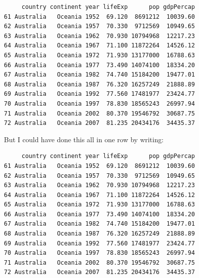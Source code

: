 \documentclass[
  letterpaper,
  DIV=11,
  numbers=noendperiod]{scrreprt}
\newenvironment{Shaded}{\begin{snugshade}}{\end{snugshade}}
\newcommand{\NormalTok}[1]{\textcolor[rgb]{0.00,0.23,0.31}{#1}}
\newcommand{\OtherTok}[1]{\textcolor[rgb]{0.00,0.23,0.31}{#1}}
\newcommand{\SpecialCharTok}[1]{\textcolor[rgb]{0.37,0.37,0.37}{#1}}
\newcommand{\StringTok}[1]{\textcolor[rgb]{0.13,0.47,0.30}{#1}}
\begin{document}
\begin{Shaded}
\end{Shaded}

\begin{verbatim}
     country continent year lifeExp      pop gdpPercap
61 Australia   Oceania 1952  69.120  8691212  10039.60
62 Australia   Oceania 1957  70.330  9712569  10949.65
63 Australia   Oceania 1962  70.930 10794968  12217.23
64 Australia   Oceania 1967  71.100 11872264  14526.12
65 Australia   Oceania 1972  71.930 13177000  16788.63
66 Australia   Oceania 1977  73.490 14074100  18334.20
67 Australia   Oceania 1982  74.740 15184200  19477.01
68 Australia   Oceania 1987  76.320 16257249  21888.89
69 Australia   Oceania 1992  77.560 17481977  23424.77
70 Australia   Oceania 1997  78.830 18565243  26997.94
71 Australia   Oceania 2002  80.370 19546792  30687.75
72 Australia   Oceania 2007  81.235 20434176  34435.37
\end{verbatim}

But I could have done this all in one row by writing:

\begin{Shaded}
\end{Shaded}

\begin{verbatim}
     country continent year lifeExp      pop gdpPercap
61 Australia   Oceania 1952  69.120  8691212  10039.60
62 Australia   Oceania 1957  70.330  9712569  10949.65
63 Australia   Oceania 1962  70.930 10794968  12217.23
64 Australia   Oceania 1967  71.100 11872264  14526.12
65 Australia   Oceania 1972  71.930 13177000  16788.63
66 Australia   Oceania 1977  73.490 14074100  18334.20
67 Australia   Oceania 1982  74.740 15184200  19477.01
68 Australia   Oceania 1987  76.320 16257249  21888.89
69 Australia   Oceania 1992  77.560 17481977  23424.77
70 Australia   Oceania 1997  78.830 18565243  26997.94
71 Australia   Oceania 2002  80.370 19546792  30687.75
72 Australia   Oceania 2007  81.235 20434176  34435.37
\end{verbatim}
\end{document}
